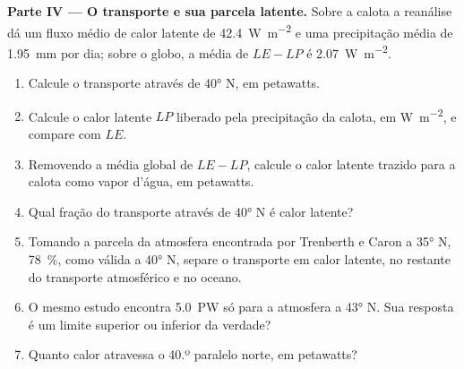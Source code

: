 \begin{problem}
\medskip
\noindent\textbf{Parte IV --- O transporte e sua parcela latente.} Sobre a calota a reanálise dá um
fluxo médio de calor latente de \qty{42.4}{W.m^{-2}} e uma precipitação média de \qty{1.95}{mm} por
dia; sobre o globo, a média de $LE - LP$ é \qty{2.07}{W.m^{-2}}.
\begin{enumerate}[resume]
  \item Calcule o transporte através de \ang{40} N, em petawatts.
  \item Calcule o calor latente $LP$ liberado pela precipitação da calota, em \unit{W.m^{-2}}, e
        compare com $LE$.
  \item Removendo a média global de $LE - LP$, calcule o calor latente trazido para a calota como
        vapor d'água, em petawatts.
  \item Qual fração do transporte através de \ang{40} N é calor latente?
  \item Tomando a parcela da atmosfera encontrada por Trenberth e Caron a \ang{35} N,
        \qty{78}{\percent}, como válida a \ang{40} N, separe o transporte em calor latente, no restante
        do transporte atmosférico e no oceano.
  \item O mesmo estudo encontra \qty{5.0}{PW} só para a atmosfera a \ang{43} N. Sua resposta é um
        limite superior ou inferior da verdade?
  \item Quanto calor atravessa o 40.º paralelo norte, em petawatts?
\end{enumerate}
\end{problem}
